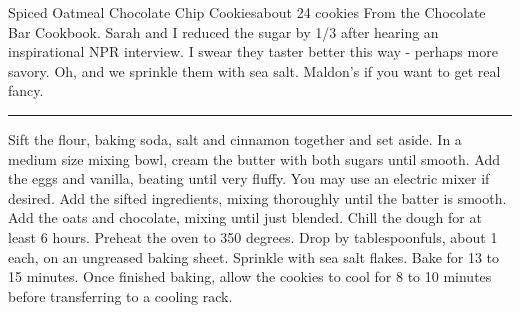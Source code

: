 \begin{recipe}{Spiced Oatmeal Chocolate Chip Cookies}{about 24 cookies}{}
\freeform
From the Chocolate Bar Cookbook. Sarah and I reduced the sugar by 1/3
after hearing an inspirational NPR interview. I swear they taster
better this way - perhaps more savory. Oh, and we sprinkle them with
sea salt. Maldon's if you want to get real fancy.\\
\rule{\textwidth}{0.05pt}
Sift the flour, baking soda, salt and cinnamon together and set aside.
In a medium size mixing bowl, cream the butter with both sugars until
smooth.
Add the eggs and vanilla, beating until very fluffy. You may use an
electric mixer if desired.
Add the sifted ingredients, mixing thoroughly until the batter is
smooth. Add the oats and chocolate, mixing until just blended. Chill
the dough for at least 6 hours.
\freeform
Preheat the oven to 350 degrees. Drop by tablespoonfuls, about 1
each, on an ungreased baking sheet. Sprinkle with sea salt
flakes. Bake for 13 to 15 minutes. Once finished baking, allow the
cookies to cool for 8 to 10 minutes before transferring to a cooling
rack.
\end{recipe}
